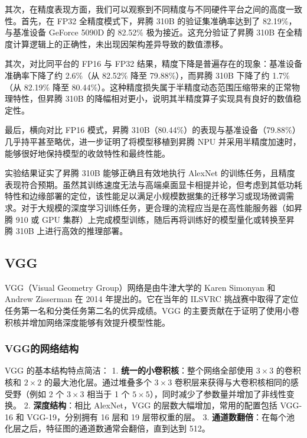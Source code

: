 其次，在精度表现方面，我们可以观察到不同精度与不同硬件平台之间的高度一致性。首先，在
FP32 全精度模式下，昇腾 310B 的验证集准确率达到了 82.19\%，与基准设备
GeForce 5090D 的 82.52\% 极为接近。这充分验证了昇腾 310B
在全精度计算逻辑上的正确性，未出现因架构差异导致的数值漂移。

其次，对比同平台的 FP16 与 FP32
结果，精度下降是普遍存在的现象：基准设备准确率下降了约 2.6\%（从 82.52\%
降至 79.88\%），而昇腾 310B 下降了约 1.7\%（从 82.19\% 降至
80.44\%）。这种精度损失属于半精度动态范围压缩带来的正常物理特性，但昇腾
310B 的降幅相对更小，说明其半精度算子实现具有良好的数值稳定性。

最后，横向对比 FP16 模式，昇腾
310B（80.44\%）的表现与基准设备（79.88\%）几乎持平甚至略优，进一步证明了将模型移植到昇腾
NPU 并采用半精度加速时，能够很好地保持模型的收敛特性和最终性能。

实验结果证实了昇腾 310B 能够正确且有效地执行 AlexNet
的训练任务，且精度表现符合预期。虽然其训练速度无法与高端桌面显卡相提并论，但考虑到其低功耗特性和边缘部署的定位，该性能足以满足小规模数据集的迁移学习或现场微调需求。对于大规模的深度学习训练任务，更合理的流程应当是在高性能服务器（如昇腾
910 或 GPU 集群）上完成模型训练，随后再将训练好的模型量化或转换至昇腾
310B 上进行高效的推理部署。

\subsection{VGG}\label{src-book-chapter3-h24}

VGG（Visual Geometry Group）网络是由牛津大学的 Karen Simonyan 和 Andrew
Zisserman 在 2014 年提出的。它在当年的 ILSVRC
挑战赛中取得了定位任务第一名和分类任务第二名的优异成绩。VGG
的主要贡献在于证明了使用小卷积核并增加网络深度能够有效提升模型性能。

\subsubsection{VGG的网络结构}\label{src-book-chapter3-h25}

VGG 的基本结构特点简洁： 1. \textbf{统一的小卷积核}：整个网络全部使用
\(3 \times 3\) 的卷积核和 \(2 \times 2\) 的最大池化层。通过堆叠多个
\(3 \times 3\) 卷积层来获得与大卷积核相同的感受野（例如 2 个
\(3 \times 3\) 相当于 1 个
\(5 \times 5\)），同时减少了参数量并增加了非线性变换。 2.
\textbf{深度结构}：相比 AlexNet，VGG 的层数大幅增加，常用的配置包括
VGG-16 和 VGG-19，分别拥有 16 层和 19 层带权重的层。 3.
\textbf{通道数翻倍}：在每个池化层之后，特征图的通道数通常会翻倍，直到达到
512。

